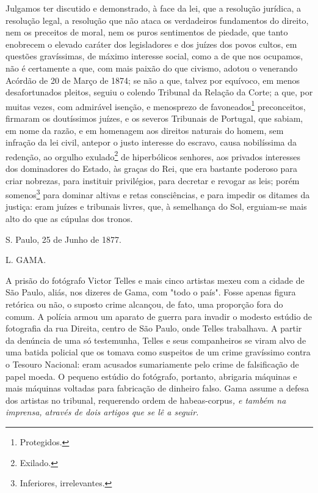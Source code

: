 Julgamos ter discutido e demonstrado, à face da lei, que a resolução
jurídica, a resolução legal, a resolução que não ataca os verdadeiros
fundamentos do direito, nem os preceitos de moral, nem os puros
sentimentos de piedade, que tanto enobrecem o elevado caráter dos
legisladores e dos juízes dos povos cultos, em questões gravíssimas, de
máximo interesse social, como a de que nos ocupamos, não é certamente a
que, com mais paixão do que civismo, adotou o venerando Acórdão de 20 de
Março de 1874; se não a que, talvez por equívoco, em menos
desafortunados pleitos, seguiu o colendo Tribunal da Relação da Corte; a
que, por muitas vezes, com admirável isenção, e menosprezo de
favoneados\footnote{Protegidos.} preconceitos, firmaram os doutíssimos
juízes, e os severos Tribunais de Portugal, que sabiam, em nome da
razão, e em homenagem aos direitos naturais do homem, sem infração da
lei civil, antepor o justo interesse do escravo, causa nobilíssima da
redenção, ao orgulho exulado\footnote{Exilado.} de hiperbólicos
senhores, aos privados interesses dos dominadores do Estado, às graças
do Rei, que era bastante poderoso para criar nobrezas, para instituir
privilégios, para decretar e revogar as leis; porém somenos\footnote{
  Inferiores, irrelevantes.}
para dominar altivas e
retas consciências, e para impedir os ditames da justiça: eram juízes e
tribunais livres, que, à semelhança do Sol, erguiam-se mais alto do que
as cúpulas dos tronos.

S. Paulo, 25 de Junho de 1877.

L. GAMA.

\pagebreak
\mbox{}\vfill
\thispagestyle{empty}

{\small\noindent
A prisão do fotógrafo Victor Telles e mais cinco artistas mexeu
com a cidade de São Paulo, aliás, nos dizeres de Gama, com "todo o
país". Fosse apenas figura retórica ou não, o suposto crime alcançou, de
fato, uma proporção fora do comum. A polícia armou um aparato de guerra
para invadir o modesto estúdio de fotografia da rua Direita, centro de
São Paulo, onde Telles trabalhava. A partir da denúncia de uma só
testemunha, Telles e seus companheiros se viram alvo de uma batida
policial que os tomava como suspeitos de um crime gravíssimo contra o
Tesouro Nacional: eram acusados sumariamente pelo crime de falsificação
de papel moeda. O pequeno estúdio do fotógrafo, portanto, abrigaria
máquinas e mais máquinas voltadas para fabricação de dinheiro falso.
Gama assume a defesa dos artistas no tribunal, requerendo ordem de}
habeas-corpus\emph{, e também na imprensa, através de dois artigos que
se lê a seguir. }

